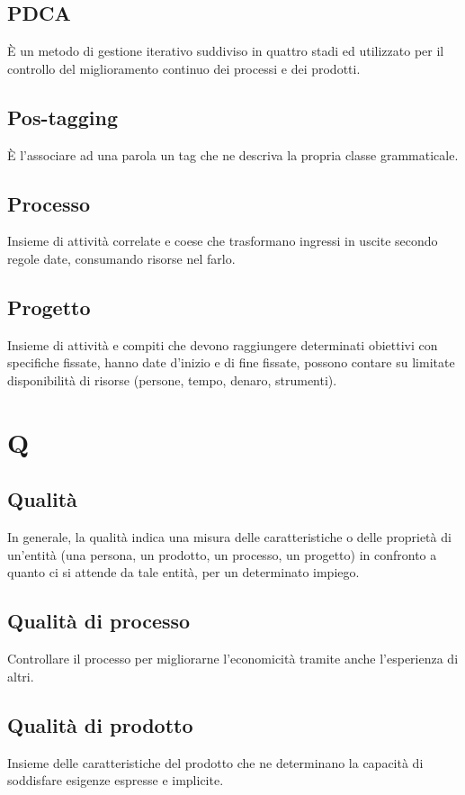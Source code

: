 {	\subsection{PDCA}
	\`E un metodo di gestione iterativo suddiviso in quattro stadi ed utilizzato per il controllo del miglioramento continuo dei processi e dei prodotti.
	
	\subsection{Pos-tagging}
	\`E l'associare ad una parola un tag che ne descriva la propria classe grammaticale.
	
	\subsection{Processo} 
	Insieme di attività correlate e coese che trasformano ingressi in uscite secondo regole date, consumando risorse nel farlo.

	\subsection{Progetto} 
	Insieme di attività e compiti che devono raggiungere determinati obiettivi con specifiche fissate, hanno date d'inizio e di fine fissate, possono contare su limitate disponibilità di risorse (persone, tempo, denaro, strumenti).
	
	\section{Q}
	\subsection{Qualità} 
	In generale, la qualità indica una misura delle caratteristiche o delle proprietà di un'entità (una persona, un prodotto, un processo, un progetto) in confronto a quanto ci si attende da tale entità, per un determinato impiego.
	
	\subsection{Qualità di processo}
	Controllare il processo per migliorarne l'economicità tramite anche l'esperienza di altri.
	
	\subsection{Qualità di prodotto}
	Insieme delle caratteristiche del prodotto che ne determinano la capacità di soddisfare esigenze espresse e implicite.
	
}
